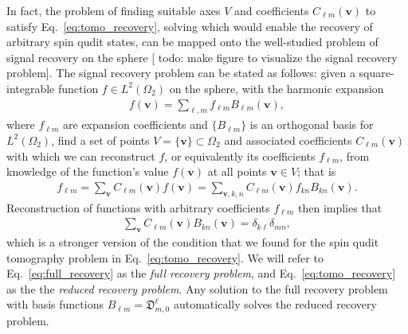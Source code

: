 \documentclass[notitlepage,twocolumn]{revtex4-2}
\newcommand{\p}[1]{\left(#1\right)} %
\renewcommand{\set}[1]{\{#1\}} %
\renewcommand{\v}{\bm} %
\newcommand{\1}{\mathds{1}}
\newcommand{\D}{\mathfrak{D}}
\newcommand{\red}[1]{{\color{red} #1}}
\begin{document}
In fact, the problem of finding suitable axes $V$ and coefficients $C_{\ell m}\p{\v v}$ to satisfy Eq.~\eqref{eq:tomo_recovery}, solving which would enable the recovery of arbitrary spin qudit states, can be mapped onto the well-studied problem of signal recovery on the sphere \cite{mcewen2011novel, mcewen2011sampling, rauhut2011sparse, alem2012sparse, khalid2014optimaldimensionality} [\red{todo: make figure to visualize the signal recovery problem}].
The signal recovery problem can be stated as follows: given a square-integrable function $f\in L^2\p{\Omega_2}$ on the sphere, with the harmonic expansion
\begin{align}
  f\p{\v v} = \sum_{\ell,m} f_{\ell m} B_{\ell m}\p{\v v},
\end{align}
where $f_{\ell m}$ are expansion coefficients and $\set{B_{\ell m}}$ is an orthogonal basis for $L^2\p{\Omega_2}$, find a set of points $V=\set{\v v}\subset\Omega_2$ and associated coefficients $C_{\ell m}\p{\v v}$ with which we can reconstruct $f$, or equivalently its coefficients $f_{\ell m}$, from knowledge of the function's value $f\p{\v v}$ at all points $\v v\in V$; that is
\begin{align}
  f_{\ell m} = \sum_{\v v} C_{\ell m}\p{\v v} f\p{\v v}
  = \sum_{\v v,k,n} C_{\ell m}\p{\v v} f_{kn} B_{kn}\p{\v v}.
\end{align}
Reconstruction of functions with arbitrary coefficients $f_{\ell m}$ then implies that
\begin{align}
  \sum_{\v v} C_{\ell m}\p{\v v} B_{kn}\p{\v v}
  = \delta_{k\ell} \delta_{mn},
  \label{eq:full_recovery}
\end{align}
which is a stronger version of the condition that we found for the spin qudit tomography problem in Eq.~\eqref{eq:tomo_recovery}.
We will refer to Eq.~\eqref{eq:full_recovery} as the {\it full recovery problem}, and Eq.~\eqref{eq:tomo_recovery} as the the {\it reduced recovery problem}.
Any solution to the full recovery problem with basis functions $B_{\ell m}=\D^\ell_{m,0}$ automatically solves the reduced recovery problem.
\end{document}
